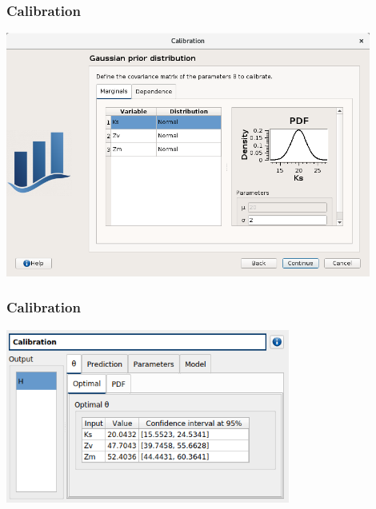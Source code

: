\documentclass{beamer}
\begin{document}
\begin{frame}
\frametitle{Calibration}
	
\begin{center}
\includegraphics[width=0.9\textwidth]{figures/calibration-Gaussien-prior.png}
\end{center}

\end{frame}


\begin{frame}
\frametitle{Calibration}
	
\begin{center}
\includegraphics[width=0.7\textwidth]{figures/calibration-ks-zv-zm-optimal.png}
\end{center}

\end{frame}

\end{document}
